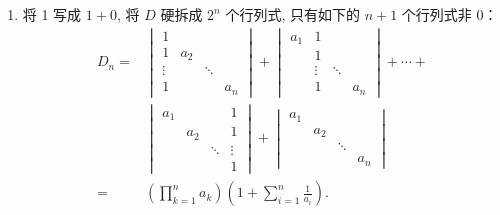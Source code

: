 \begin{exercise}
\begin{exgroup}
\begin{answer}
\begin{enumerate}
                \item 将 1 写成 $1+0$, 将 $D$ 硬拆成 $2^{n}$ 个行列式, 只有如下的 $n+1$ 个行列式非 0：
                      \begin{align*}
                          D_n = & \begin{vmatrix}
                                      1      &       &        &       \\
                                      1      & a_{2} &        &       \\
                                      \vdots &       & \ddots &       \\
                                      1      &       &        & a_{n}
                                  \end{vmatrix}
                          +\begin{vmatrix}
                               a_{1} & 1      &                \\
                                     & 1      &                \\
                                     & \vdots & \ddots &       \\
                                     & 1      &        & a_{n}
                           \end{vmatrix}+\cdots+                    \\
                                & \begin{vmatrix}
                                      a_{1} &       &        & 1      \\
                                            & a_{2} &        & 1      \\
                                            &       & \ddots & \vdots \\
                                            &       &        & 1
                                  \end{vmatrix}
                          +\begin{vmatrix}
                               a_{1} &                      \\
                                     & a_{2} &              \\
                                     &       & \ddots &     \\
                                     &       &        & a_n
                           \end{vmatrix}                       \\
                          =     & \left(\prod_{k=1}^na_k\right)
                          \left(1+\sum_{i=1}^n\frac{1}{a_i}\right).
                      \end{align*}
            \end{enumerate}
        \end{answer}


\end{exgroup}
\end{exercise}

